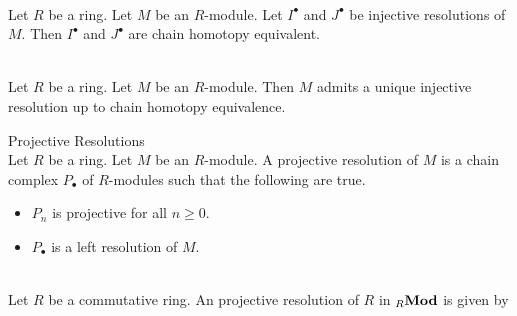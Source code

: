 \documentclass[a4paper]{article}
\begin{document}
\begin{crl}{}{}\\
Let $R$ be a ring. Let $M$ be an $R$-module. Let $I^\bullet$ and $J^\bullet$ be injective resolutions of $M$. Then $I^\bullet$ and $J^\bullet$ are chain homotopy equivalent. 
\end{crl}

\begin{prp}{}{}\\
Let $R$ be a ring. Let $M$ be an $R$-module. Then $M$ admits a unique injective resolution up to chain homotopy equivalence. 
\end{prp}

\begin{defn}{Projective Resolutions}{}\\
Let $R$ be a ring. Let $M$ be an $R$-module. A projective resolution of $M$ is a chain complex $P_\bullet$ of $R$-modules such that the following are true. 
\begin{itemize}
\item $P_n$ is projective for all $n\geq 0$. 
\item $P_\bullet$ is a left resolution of $M$. 
\end{itemize}
\end{defn}

\begin{eg}{}{}\\
Let $R$ be a commutative ring. An projective resolution of $R$ in ${_R}\bold{Mod}$ is given by \\~\\
\\
\end{eg}
\end{document}
